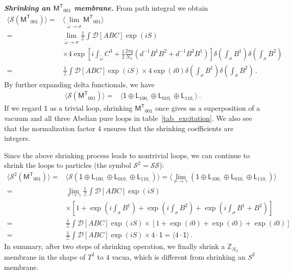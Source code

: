 \documentclass[11pt,nofootinbib,preprint]{revtex4-1}
\begin{document}
\textbf{\textit{Shrinking an $\mathsf{M^T}_{001}$ membrane.}}
From path integral we obtain
\begin{align}
	\langle \mathcal{S} \left( \mathsf{M^T}_{001} \right) \rangle =&\langle \underset{\tilde{\omega} \rightarrow \sigma}{\lim}\mathsf{M^T}_{001} \rangle \nonumber
	\\
	=&\underset{\tilde{\omega} \rightarrow \sigma}{\lim}\frac{1}{\mathcal{Z}}\int{\mathcal{D} \left[ ABC\right] \exp \left( iS \right)} \nonumber
	\\
	&\times 4\exp \left[ i\int_{\tilde{\omega}}{C^3+\frac{1}{2}\frac{2\pi q}{N_3}\left( d^{-1}B^1B^2+d^{-1}B^2B^1 \right)} \right]\delta \left( \int_{\sigma}{B^1} \right) \delta \left( \int_{\sigma}{B^2} \right) \nonumber
	\\
	=&\frac{1}{\mathcal{Z}}\int{\mathcal{D} \left[ ABC \right] \exp \left( iS \right)}\times 4\exp \left( i0 \right) \delta \left( \int_{\sigma}{B^1} \right) \delta \left( \int_{\sigma}{B^2} \right) \,.
\end{align}
By further expanding delta functionals, we have
\begin{align}
	\langle \mathcal{S} \left( \mathsf{M^T}_{001} \right) \rangle 
	=&\langle \mathsf{1}\oplus \mathsf{L}_{100,}\oplus \mathsf{L}_{010,}\oplus \mathsf{L}_{110,} \rangle \,.
\end{align}
If we regard $\mathsf{1}$ as a trivial loop, shrinking $\mathsf{M^T}_{001}$ once gives us a superposition of a vacuum and  all three Abelian pure loops in table~\ref{tab_excitation}. We also see that the normalization factor $4$ ensures that the shrinking coefficients are integers. 


Since the above shrinking process leads to nontrivial loops, we can continue to shrink the loops to particles (the symbol $\mathcal{S}^2=\mathcal{S}\mathcal{S}$):
\begin{align}
	\langle \mathcal{S} ^2\left( \mathsf{M^T}_{001} \right) \rangle =&\langle \mathcal{S} \left( \mathsf{1}\oplus \mathsf{L}_{100,}\oplus \mathsf{L}_{010,}\oplus \mathsf{L}_{110,} \right) \rangle =\langle \underset{\sigma \rightarrow \gamma}{\lim}\left( \mathsf{1}\oplus \mathsf{L}_{100,}\oplus \mathsf{L}_{010,}\oplus \mathsf{L}_{110,} \right) \rangle \nonumber
	\\
	=&\underset{\sigma \rightarrow \gamma}{\lim}\frac{1}{\mathcal{Z}}\int{\mathcal{D} \left[ABC  \right] \exp \left( iS \right)}\nonumber
	\\
	&\times \left[ 1+\exp \left( i\int_{\sigma}{B^1} \right) +\exp \left( i\int_{\sigma}{B^2} \right) +\exp \left( i\int_{\sigma}{B^1+B^2} \right) \right] \nonumber
	\\
	=&\frac{1}{\mathcal{Z}}\int{\mathcal{D} \left[ ABC \right] \exp \left( iS \right) \times \left[ 1+\exp \left( i0 \right) +\exp \left( i0 \right) +\exp \left( i0 \right) \right]}\nonumber
	\\
	=&\frac{1}{\mathcal{Z}}\int{\mathcal{D} \left[ ABC \right] \exp \left( iS \right) \times 4\cdot \mathsf{1}}=\langle 4\cdot \mathsf{1} \rangle \,.
\end{align}
In summary,  after two steps of shrinking operation, we finally shrink a $\mathbb{Z}_{N_3}$ membrane in the shape of $T^2$ to $4$ vacua, which is    different from shrinking an $S^2$ membrane.
\end{document}
